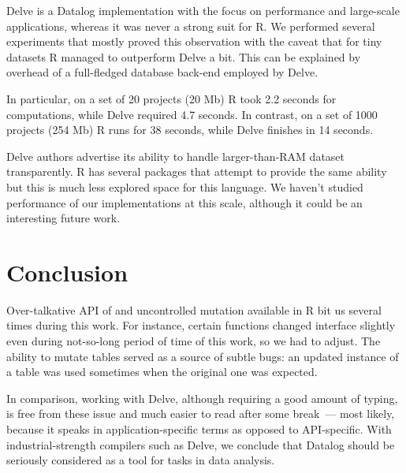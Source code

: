 Delve is a Datalog implementation with the focus on performance and large-scale
applications, whereas it was never a strong suit for R. We performed several
experiments that mostly proved this observation with the caveat that for tiny
datasets R managed to outperform Delve a bit. This can be explained by
overhead of a full-fledged database back-end employed by Delve.

In particular, on a set of 20 projects (20 Mb) R took 2.2 seconds for computations,
while Delve required 4.7 seconds. In contrast, on a set of 1000 projects (254 Mb)
R runs for 38 seconds, while Delve finishes in 14 seconds.

Delve authors advertise its ability to handle larger-than-RAM dataset
transparently. R has several packages that attempt to provide the same ability
but this is much less explored space for this language. We haven't studied
performance of our implementations at this scale, although it could be an
interesting future work.

\section{Conclusion}

Over-talkative API of \dplyr and uncontrolled mutation available in R bit us
several times during this work. For instance, certain \dplyr functions changed
interface slightly even during not-so-long period of time of this work, so we
had to adjust. The ability to mutate tables served as a source of subtle bugs:
an updated instance of a table was used sometimes when the original one was expected.

In comparison, working with Delve, although requiring a good
amount of typing, is free from these issue and much easier to read after some
break~--- most likely, because it speaks in application-specific terms as
opposed to API-specific. With industrial-strength compilers such as Delve, we
conclude that Datalog should be seriously considered as a tool for tasks in
data analysis.


